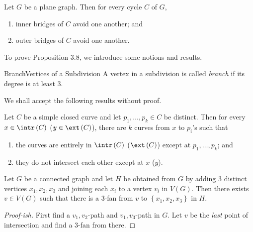 \documentclass[co342]{subfiles}
\begin{document}
    \begin{prop}{}
        Let $G$ be a plane graph. Then for every cycle $C$ of $G$,
        \begin{enumerate}
            \item inner bridges of $C$ avoid one another; and
            \item outer bridges of $C$ avoid one another.
        \end{enumerate}
    \end{prop}

    \noindent To prove Proposition 3.8, we introduce some notions and results.

    \begin{definition}{Branch}{Vertices of a Subdivision}
        A vertex in a subdivision is called \emph{branch} if its degree is at least $3$.
    \end{definition}

    \noindent We shall accept the following results without proof.

    \begin{fact}{}
        Let $C$ be a simple closed curve and let $p_1,\ldots,p_k\in C$ be distinct. Then for every $x\in\intr\left( C \right)$ ($y\in\ext\left( C \right)$), there are $k$ curves from $x$ to $p_i$'s such that
        \begin{enumerate}
            \item the curves are entirely in $\intr\left( C \right)$ ($\ext\left( C \right)$) except at $p_1,\ldots,p_k$; and
            \item they do not intersect each other except at $x$ ($y$).
        \end{enumerate}
    \end{fact}
    
    \begin{fact}{}
        Let $G$ be a connected graph and let $H$ be obtained from $G$ by adding $3$ distinct vertices $x_1,x_2,x_3$ and joining each $x_i$ to a vertex $v_i$ in $V\left( G \right)$. Then there exists $v\in V\left( G \right)$ such that there is a $3$-fan from $v$ to $\left\lbrace x_1,x_2,x_3 \right\rbrace$ in $H$.
    \end{fact}
    
    \begin{proof}[Proof-ish]
        First find a $v_1,v_2$-path and $v_1,v_3$-path in $G$. Let $v$ be the \textit{last} point of intersection and find a $3$-fan from there.
    \end{proof}
    
\end{document}
